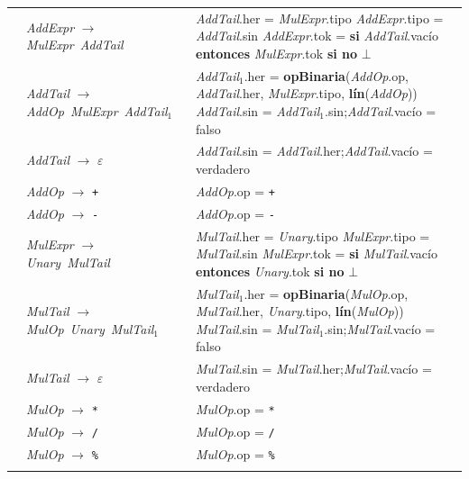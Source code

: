 \documentclass[11pt]{article}
\newcommand{\NT}[1]{\textcolor{ntcolor}{\textit{#1}}}            %
\newcommand{\T}[1]{\textcolor{tcolor}{\texttt{#1}}}              %
\newcommand{\A}[2]{\NT{#1}.\textsf{#2}}                          %
\newcommand{\Ax}[3]{\NT{#1}$_{#2}$.\textsf{#3}}                  %
\newcommand{\fn}[1]{\textsf{\textbf{#1}}}                        %
\newcommand{\kw}[1]{\textbf{#1}}                                 %
\begin{document}
{\begin{longtable}{@{}r@{\hspace{6pt}}>{\raggedright\arraybackslash}p{5.6cm}@{\hspace{8pt}}>{\raggedright\arraybackslash}p{9.9cm}@{}}
\addlinespace[2pt]
{(86)} & \NT{AddExpr} $\rightarrow$ \NT{MulExpr}\ \NT{AddTail} & \A{AddTail}{her} = \A{MulExpr}{tipo} \newline \A{AddExpr}{tipo} = \A{AddTail}{sin} \newline \A{AddExpr}{tok} = \kw{si} \A{AddTail}{vacío} \kw{entonces} \A{MulExpr}{tok} \kw{si no} $\bot$ \\
\addlinespace[2pt]
{(87)} & \NT{AddTail} $\rightarrow$ \NT{AddOp}\ \NT{MulExpr}\ \NT{AddTail}$_{1}$ & \Ax{AddTail}{1}{her} = \fn{opBinaria}(\A{AddOp}{op}, \A{AddTail}{her}, \A{MulExpr}{tipo}, \fn{lín}(\NT{AddOp})) \newline \A{AddTail}{sin} = \Ax{AddTail}{1}{sin};\quad \A{AddTail}{vacío} = \textsf{falso} \\
\addlinespace[2pt]
{(88)} & \NT{AddTail} $\rightarrow$ $\varepsilon$ & \A{AddTail}{sin} = \A{AddTail}{her};\quad \A{AddTail}{vacío} = \textsf{verdadero} \\
\addlinespace[2pt]
{(89)} & \NT{AddOp} $\rightarrow$ \T{+} & \A{AddOp}{op} = \T{+} \\
\addlinespace[2pt]
{(90)} & \NT{AddOp} $\rightarrow$ \T{-} & \A{AddOp}{op} = \T{-} \\
\addlinespace[2pt]
{(91)} & \NT{MulExpr} $\rightarrow$ \NT{Unary}\ \NT{MulTail} & \A{MulTail}{her} = \A{Unary}{tipo} \newline \A{MulExpr}{tipo} = \A{MulTail}{sin} \newline \A{MulExpr}{tok} = \kw{si} \A{MulTail}{vacío} \kw{entonces} \A{Unary}{tok} \kw{si no} $\bot$ \\
\addlinespace[2pt]
{(92)} & \NT{MulTail} $\rightarrow$ \NT{MulOp}\ \NT{Unary}\ \NT{MulTail}$_{1}$ & \Ax{MulTail}{1}{her} = \fn{opBinaria}(\A{MulOp}{op}, \A{MulTail}{her}, \A{Unary}{tipo}, \fn{lín}(\NT{MulOp})) \newline \A{MulTail}{sin} = \Ax{MulTail}{1}{sin};\quad \A{MulTail}{vacío} = \textsf{falso} \\
\addlinespace[2pt]
{(93)} & \NT{MulTail} $\rightarrow$ $\varepsilon$ & \A{MulTail}{sin} = \A{MulTail}{her};\quad \A{MulTail}{vacío} = \textsf{verdadero} \\
\addlinespace[2pt]
{(94)} & \NT{MulOp} $\rightarrow$ \T{*} & \A{MulOp}{op} = \T{*} \\
\addlinespace[2pt]
{(95)} & \NT{MulOp} $\rightarrow$ \T{/} & \A{MulOp}{op} = \T{/} \\
\addlinespace[2pt]
{(96)} & \NT{MulOp} $\rightarrow$ \T{\%} & \A{MulOp}{op} = \T{\%} \\
\addlinespace[2pt]
\midrule

\end{longtable}}
\end{document}
